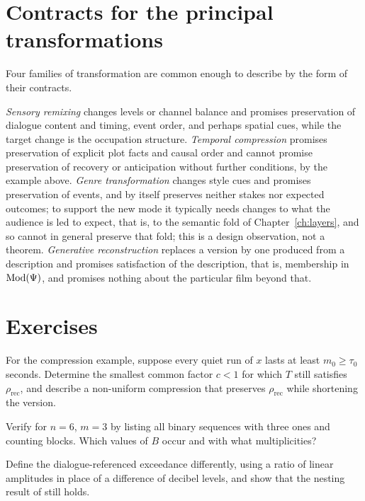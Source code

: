 \section{Contracts for the principal transformations}

Four families of transformation are common enough to describe by the form of their contracts.

\emph{Sensory remixing} changes levels or channel balance and promises preservation of dialogue content and timing, event order, and perhaps spatial cues, while the target change is the occupation structure. \emph{Temporal compression} promises preservation of explicit plot facts and causal order and cannot promise preservation of recovery or anticipation without further conditions, by the example above. \emph{Genre transformation} changes style cues and promises preservation of events, and by itself preserves neither stakes nor expected outcomes; to support the new mode it typically needs changes to what the audience is led to expect, that is, to the semantic fold of Chapter~\ref{ch:layers}, and so cannot in general preserve that fold; this is a design observation, not a theorem. \emph{Generative reconstruction} replaces a version by one produced from a description and promises satisfaction of the description, that is, membership in $\operatorname{Mod}(\Psi)$, and promises nothing about the particular film beyond that.

\section*{Exercises}

\begin{exercise}
For the compression example, suppose every quiet run of $x$ lasts at least $m_0\ge\tau_0$ seconds. Determine the smallest common factor $c<1$ for which $T$ still satisfies $\rho_{\mathrm{rec}}$, and describe a non-uniform compression that preserves $\rho_{\mathrm{rec}}$ while shortening the version.
\end{exercise}

\begin{exercise}
Verify  for $n=6$, $m=3$ by listing all binary sequences with three ones and counting blocks. Which values of $B$ occur and with what multiplicities?
\end{exercise}

\begin{exercise}
Define the dialogue-referenced exceedance differently, using a ratio of linear amplitudes in place of a difference of decibel levels, and show that the nesting result of  still holds.
\end{exercise}

